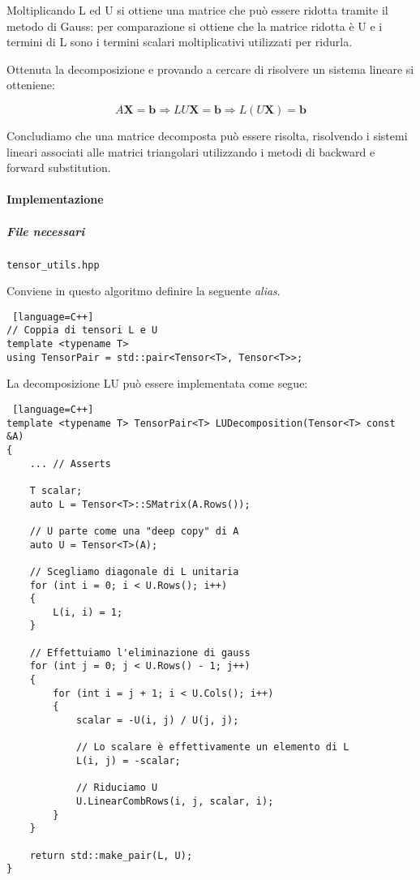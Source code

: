 Moltiplicando L ed U si ottiene una matrice che può essere ridotta tramite il metodo
di Gauss: per comparazione si ottiene che la matrice ridotta è U e i termini di L sono
i termini scalari moltiplicativi utilizzati per ridurla.

Ottenuta la decomposizione e provando a cercare di risolvere un sistema lineare si otteniene:

$$
	A \mathbf{X} = \mathbf{b} \Rightarrow LU \mathbf{X} = \mathbf{b} \Rightarrow L(U \mathbf{X}) = \mathbf{b}
$$

Concludiamo che una matrice decomposta può essere risolta, risolvendo i sistemi
lineari associati alle matrici triangolari utilizzando i metodi di backward e
forward substitution.

\paragraph{Implementazione}

\subparagraph{File necessari} \texttt{tensor\_utils.hpp}

Conviene in questo algoritmo definire la seguente \textit{alias}.

\begin{lstlisting} [language=C++]
// Coppia di tensori L e U
template <typename T>
using TensorPair = std::pair<Tensor<T>, Tensor<T>>;
\end{lstlisting}

La decomposizione LU può essere implementata come segue:

\begin{lstlisting} [language=C++]
template <typename T> TensorPair<T> LUDecomposition(Tensor<T> const &A)
{
    ... // Asserts

    T scalar;
    auto L = Tensor<T>::SMatrix(A.Rows());

    // U parte come una "deep copy" di A
    auto U = Tensor<T>(A);

    // Scegliamo diagonale di L unitaria
    for (int i = 0; i < U.Rows(); i++)
    {
        L(i, i) = 1;
    }

    // Effettuiamo l'eliminazione di gauss
    for (int j = 0; j < U.Rows() - 1; j++)
    {
        for (int i = j + 1; i < U.Cols(); i++)
        {
            scalar = -U(i, j) / U(j, j);

            // Lo scalare è effettivamente un elemento di L
            L(i, j) = -scalar;

            // Riduciamo U
            U.LinearCombRows(i, j, scalar, i);
        }
    }

    return std::make_pair(L, U);
}
\end{lstlisting}

